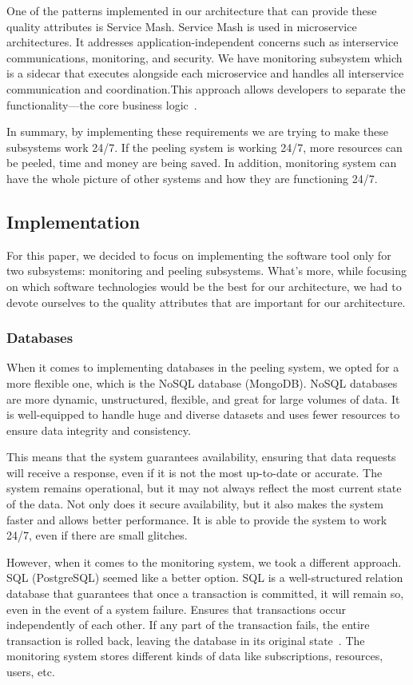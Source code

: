 \documentclass[conference]{IEEEtran}
\begin{document}
One of the patterns implemented in our architecture that can provide these quality attributes is Service Mash. Service Mash is used in microservice architectures. It addresses application-independent concerns such as interservice communications, monitoring, and security. We have monitoring subsystem which is a sidecar that executes alongside each microservice and handles all interservice communication and coordination.This approach allows developers to separate the functionality—the core business logic~\cite{b1}.

In summary, by implementing these requirements we are trying to make these subsystems work 24/7. If the peeling system is working 24/7, more resources can be peeled, time and money are being saved. In addition, monitoring system can have the whole picture of other systems and how they are functioning 24/7.

\subsection{Implementation}
\color{black}

For this paper, we decided to focus on implementing the software tool only for two subsystems: monitoring and peeling subsystems. 
What's more, while focusing on which software technologies would be the best for our architecture, we had to devote ourselves to the quality attributes that are important for our architecture. 

\subsubsection{Databases}
When it comes to implementing databases in the peeling system, we opted for a more flexible one, which is the NoSQL database (MongoDB). NoSQL databases are more dynamic, unstructured, flexible, and great for large volumes of data. It is well-equipped to handle huge and diverse datasets and uses fewer resources to ensure data integrity and consistency. 

This means that the system guarantees availability, ensuring that data requests will receive a response, even if it is not the most up-to-date or accurate. The system remains operational, but it may not always reflect the most current state of the data. Not only does it secure availability, but it also makes the system faster and allows better performance. It is able to provide the system to work 24/7, even if there are small glitches. 

However, when it comes to the monitoring system, we took a different approach. SQL (PostgreSQL) seemed like a better option. SQL is a well-structured relation database that guarantees that once a transaction is committed, it will remain so, even in the event of a system failure. Ensures that transactions occur independently of each other. If any part of the transaction fails, the entire transaction is rolled back, leaving the database in its original state~\cite{b2}. The monitoring system stores different kinds of data like subscriptions, resources, users, etc. 
\end{document}
